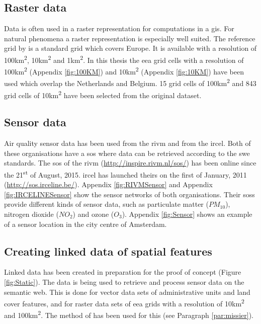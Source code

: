 \subsection{Raster data}
Data is often used in a raster representation for computations in a \ac{gis}. For natural phenomena a raster representation is especially well suited. The reference grid by \cite{DATA:EEA} is a standard grid which covers Europe. It is available with a resolution of 100km\textsuperscript{2}, 10km\textsuperscript{2} and 1km\textsuperscript{2}. In this thesis the \ac{eea} grid cells with a resolution of 100km\textsuperscript{2} (Appendix \ref{fig:100KM}) and 10km\textsuperscript{2} (Appendix \ref{fig:10KM}) have been used which overlap the Netherlands and Belgium. 15 grid cells of 100km\textsuperscript{2} and 843 grid cells of 10km\textsuperscript{2} have been selected from the original dataset.  

\subsection{Sensor data}
\label{sensor}
\begin{sloppypar}
Air quality sensor data has been used from the \acf{rivm} and from the \acf{ircel}. Both of these organisations have a \ac{sos} where data can be retrieved according to the \ac{swe} standards. The \ac{sos} of the \ac{rivm} (\url{http://inspire.rivm.nl/sos/}) has been online since the 21\textsuperscript{st} of August, 2015. \ac{ircel} has launched theirs on the first of January, 2011 (\url{http://sos.irceline.be/}). Appendix \ref{fig:RIVMSensor} and Appendix \ref{fig:IRCELINESensor} show the sensor networks of both organisations. Their \aclp{sos} provide different kinds of sensor data, such as particulate matter ($PM_{10}$), nitrogen dioxide ($NO_{2}$) and ozone ($O_{3}$). Appendix \ref{fig:Sensor} shows an example of a sensor location in the city centre of Amsterdam. 
\end{sloppypar}

\subsection{Creating linked data of spatial features}
\label{linked}
Linked data has been created in preparation for the proof of concept (Figure \ref{fig:Static}). The data is being used to retrieve and process sensor data on the semantic web. This is done for vector data sets of administrative units and land cover features, and for raster data sets of \ac{eea} grids with a resolution of 10km\textsuperscript{2} and 100km\textsuperscript{2}. The method of \cite{LD:Missier} has been used for this (see Paragraph \ref{par:missier}).

